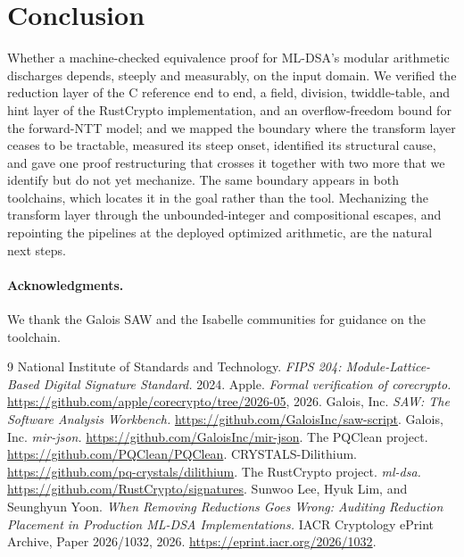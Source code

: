 \documentclass[11pt]{article}
\begin{document}
\section{Conclusion}\label{sec:conclusion}

Whether a machine-checked equivalence proof for ML-DSA's modular arithmetic discharges depends, steeply
and measurably, on the input domain. We verified the reduction layer of the C reference end to end, a
field, division, twiddle-table, and hint layer of the RustCrypto implementation, and an overflow-freedom
bound for the forward-NTT model; and we mapped the boundary where the transform layer ceases to be
tractable, measured its steep onset, identified its structural cause, and gave one proof restructuring
that crosses it together with two more that we identify but do not yet mechanize. The same boundary
appears in both toolchains, which locates it in the goal rather than the tool. Mechanizing the
transform layer through the unbounded-integer and compositional escapes, and repointing the pipelines at
the deployed optimized arithmetic, are the natural next steps.

\paragraph{Acknowledgments.} We thank the Galois SAW and the Isabelle communities for guidance on the
toolchain.

\begin{thebibliography}{9}
 National Institute of Standards and Technology.
  \emph{FIPS 204: Module-Lattice-Based Digital Signature Standard.} 2024.
 Apple. \emph{Formal verification of corecrypto.}
  \url{https://github.com/apple/corecrypto/tree/2026-05}, 2026.
 Galois, Inc. \emph{SAW: The Software Analysis Workbench.}
  \url{https://github.com/GaloisInc/saw-script}.
 Galois, Inc. \emph{mir-json.} \url{https://github.com/GaloisInc/mir-json}.
 The PQClean project. \url{https://github.com/PQClean/PQClean}.
 CRYSTALS-Dilithium. \url{https://github.com/pq-crystals/dilithium}.
 The RustCrypto project. \emph{ml-dsa.}
  \url{https://github.com/RustCrypto/signatures}.
 Sunwoo Lee, Hyuk Lim, and Seunghyun Yoon.
  \emph{When Removing Reductions Goes Wrong: Auditing Reduction Placement in Production ML-DSA
  Implementations.} IACR Cryptology ePrint Archive, Paper 2026/1032, 2026.
  \url{https://eprint.iacr.org/2026/1032}.
\end{thebibliography}
\end{document}
